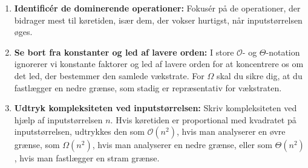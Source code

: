 \begin{enumerate}
    \item \textbf{Identificér de dominerende operationer:} Fokusér på de operationer, der bidrager mest til køretiden, især dem, der vokser hurtigst, når inputstørrelsen øges.
    
    \item \textbf{Se bort fra konstanter og led af lavere orden:} I store $\mathcal{O}$- og $\Theta$-notation ignorerer vi konstante faktorer og led af lavere orden for at koncentrere os om det led, der bestemmer den samlede vækstrate. For $\Omega$ skal du sikre dig, at du fastlægger en nedre grænse, som stadig er repræsentativ for vækstraten.
    
    \item \textbf{Udtryk kompleksiteten ved inputstørrelsen:} Skriv kompleksiteten ved hjælp af inputstørrelsen $n$. Hvis køretiden er proportional med kvadratet på inputstørrelsen, udtrykkes den som $\mathcal{O}(n^2)$, hvis man analyserer en øvre grænse, som $\Omega(n^2)$, hvis man analyserer en nedre grænse, eller som $\Theta(n^2)$, hvis man fastlægger en stram grænse.
\end{enumerate}


